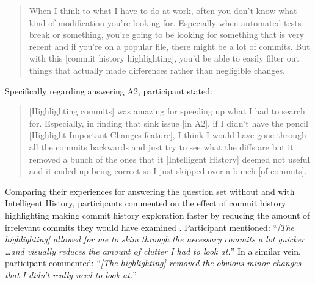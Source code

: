 \begin{quote}
  When I think to what I have to do at work, 
  often you don’t know what kind of modification you’re looking for. 
  Especially when automated tests break or something, 
  you’re going to be looking for something that is very recent and if you’re on a popular file, 
  there might be a lot of commits. 
  But with this [commit history highlighting], 
  you’d be able to easily filter out things that actually made differences rather than negligible changes.
\end{quote}

Specifically regarding answering A2, participant  stated:

\begin{quote}
  [Highlighting commits] was amazing for speeding up what I had to search for. 
  Especially, in finding that sink issue [in A2], if I didn’t have the pencil [Highlight Important Changes feature], 
  I think I would have gone through all the commits backwards and just try to see what the diffs are 
  but it removed a bunch of the ones that it [Intelligent History] deemed not useful and it ended up being correct so I just skipped over a bunch [of commits].
\end{quote}

Comparing their experiences for answering the question set without and with Intelligent History, 
participants commented on the effect of commit history highlighting making commit history exploration faster by reducing the amount of irrelevant commits they would have examined .
Participant  mentioned: 
``\textit{[The highlighting] allowed for me to skim through the necessary commits a lot quicker \dots and visually reduces the amount of clutter I had to look at.}''
In a similar vein, participant  commented:
``\textit{[The highlighting] removed the obvious minor changes that I didn’t really need to look at.}''

